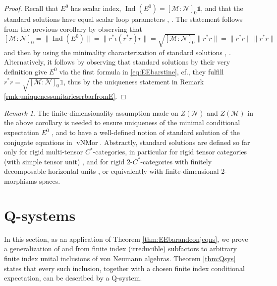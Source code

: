 \documentclass[11pt,a4paper]{article}
\makeatletter
\newcommand{\oneop}{\mathds{1}}
\newcommand{\rbar}{{\overline{r}}}
\newcommand{\M}{\mathcal{M}}
\newcommand{\N}{\mathcal{N}}
\DeclareMathOperator{\vNMor}{vNMor}
\DeclareMathOperator{\Ind}{Ind}
\DeclareRobustCommand{\cf}{cf.\@\xspace}
\DeclareRobustCommand{\Sec}{Sec.\@\xspace}
\DeclareRobustCommand{\Prop}{Prop.\@\xspace}
\DeclareRobustCommand{\Thm}{Thm.\@\xspace}
\DeclareRobustCommand{\Def}{Def.\@\xspace}
\newcommand{\Cstar}{$C^\ast$\@\xspace}
\theoremstyle{plain}
\theoremstyle{definition}
\theoremstyle{remark}
\newtheorem{rmk}[thm]{Remark}
\numberwithin{equation}{section}%
\makeatother
\begin{document}
\begin{proof}
Recall that $E^0$ has scalar index, $\Ind(E^0) = [\M:\N]_0\oneop$, and that the standard solutions have equal scalar loop parameters \cite[\Prop 8.30]{GiLo19}, \cite[\Thm 2.20]{BCEGP20}. The statement follows from the previous corollary by observing that
$$[\M:\N]_0 = \|\Ind(E^0)\| = \|\rbar^* \iota(r^*r) \rbar\| = \sqrt{[\M:\N]_0} \|\rbar^* \rbar\| = \|r^* r\| \|\rbar^* \rbar\|$$
and then by using the minimality characterization of standard solutions \cite[\Thm 3.11]{LoRo97}, \cite[\Thm 8.44]{GiLo19}.
Alternatively, it follows by observing that standard solutions by their very definition \cite[\Def 8.29]{GiLo19} give $E^0$ via the first formula in \eqref{eq:EEbarstine}, \cf \cite[\Thm 2.6]{GiLo19}, they fulfill $r^*r = \sqrt{[\M:\N]_0} \oneop$, thus by the uniqueness statement in Remark \ref{rmk:uniquenessunitariesrrbarfromE}.
\end{proof}

\begin{rmk}
The finite-dimensionality assumption made on $Z(\N)$ and $Z(\M)$ in the above corollary is needed to ensure uniqueness of the minimal conditional expectation $E^0$ \cite[\Thm 2.9]{Hav90}, \cite[\Prop 3.1]{Ter92} and to have a well-defined notion of standard solution of the conjugate equations in $\vNMor$. Abstractly, standard solutions are defined so far only for rigid multi-tensor \Cstar-categories, in particular for rigid tensor categories (with simple tensor unit) \cite[\Sec 3]{LoRo97}, and for rigid 2-\Cstar-categories with finitely decomposable horizontal units \cite[\Sec 8]{GiLo19}, or equivalently \cite[\Prop 8.16]{GiLo19} with finite-dimensional 2-morphisms spaces.
\end{rmk}


\section{Q-systems}\label{sec:Qsys}


In this section, as an application of Theorem \ref{thm:EEbarandconjeqns}, we prove a generalization of \cite[\Thm 5.1]{Lon94} and \cite[\Thm 3.11]{BKLR15} from finite index (irreducible) subfactors to arbitrary finite index unital inclusions of von Neumann algebras. Theorem \ref{thm:Qsys} states that every such inclusion, together with a chosen finite index conditional expectation, can be described by a Q-system. 
\end{document}
